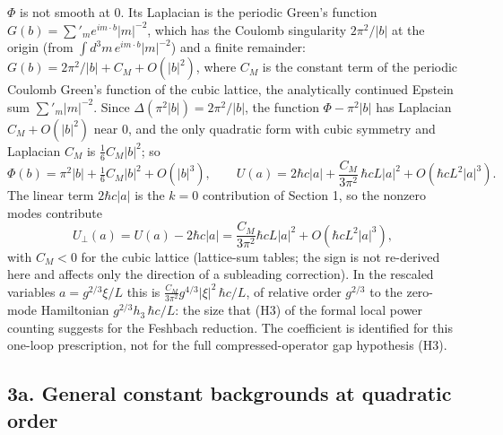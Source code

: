 \documentclass[11pt,a4paper]{article}
\begin{document}
\(\Phi\) is not smooth at \(0\). Its Laplacian is the periodic Green's
function \(G(b)=\sum'_me^{im\cdot b}|m|^{-2}\), which has the Coulomb
singularity \(2\pi^2/|b|\) at the origin (from
\(\int d^3m\,e^{im\cdot b}|m|^{-2}\)) and a finite remainder:
\(G(b)=2\pi^2/|b|+C_M+O(|b|^2)\), where \(C_M\) is the constant term of
the periodic Coulomb Green's function of the cubic lattice, the
analytically continued Epstein sum \(\sum'_m|m|^{-2}\). Since
\(\Delta(\pi^2|b|)=2\pi^2/|b|\), the function \(\Phi-\pi^2|b|\) has
Laplacian \(C_M+O(|b|^2)\) near \(0\), and the only quadratic form with
cubic symmetry and Laplacian \(C_M\) is \(\tfrac16C_M|b|^2\); so
\[\Phi(b)=\pi^2|b|+\tfrac16C_M|b|^2+O(|b|^3),\qquad
U(a)=2\hbar c|a|+\frac{C_M}{3\pi^2}\,\hbar cL|a|^2+O(\hbar cL^2|a|^3).\]
The linear term \(2\hbar c|a|\) is the \(k=0\) contribution of Section
1, so the nonzero modes contribute
\[U_\perp(a)=U(a)-2\hbar c|a|=\frac{C_M}{3\pi^2}\hbar cL|a|^2+O(\hbar cL^2|a|^3),\]
with \(C_M<0\) for the cubic lattice (lattice-sum tables; the sign is
not re-derived here and affects only the direction of a subleading
correction). In the rescaled variables \(a=g^{2/3}\xi/L\) this is
\(\frac{C_M}{3\pi^2}g^{4/3}|\xi|^2\,\hbar c/L\), of relative order
\(g^{2/3}\) to the zero-mode Hamiltonian \(g^{2/3}h_3\,\hbar c/L\): the
size that (H3) of the formal local power counting suggests for the
Feshbach reduction. The coefficient is identified for this one-loop
prescription, not for the full compressed-operator gap hypothesis (H3).

\hypertarget{a.-general-constant-backgrounds-at-quadratic-order}{%
\subsection{3a. General constant backgrounds at quadratic
order}\label{a.-general-constant-backgrounds-at-quadratic-order}}
\end{document}
